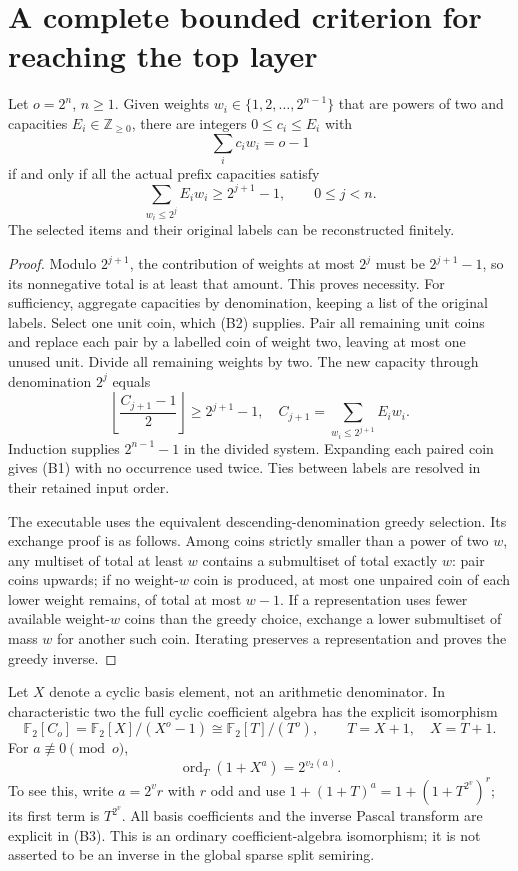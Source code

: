 \section{A complete bounded criterion for reaching the top layer}
\begin{lemma}\label{lem:coins}
Let $o=2^n$, $n\ge1$. Given weights $w_i\in\{1,2,\ldots,2^{n-1}\}$
that are powers of two and capacities $E_i\in\mathbb Z_{\ge0}$, there are
integers $0\le c_i\le E_i$ with
\[
 \sum_i c_iw_i=o-1                                        \tag{B1}
\]
if and only if all the actual prefix capacities satisfy
\[
 \boxed{\sum_{w_i\le2^j}E_iw_i\ge2^{j+1}-1,
 \qquad0\le j<n.}                                        \tag{B2}
\]
The selected items and their original labels can be reconstructed finitely.
\end{lemma}
\begin{proof}
Modulo $2^{j+1}$, the contribution of weights at most $2^j$ must be
$2^{j+1}-1$, so its nonnegative total is at least that amount. This proves
necessity. For sufficiency, aggregate capacities by denomination, keeping a
list of the original labels. Select one unit coin, which (B2) supplies.
Pair all remaining unit coins and replace each pair by a labelled coin of
weight two, leaving at most one unused unit. Divide all remaining weights
by two. The new capacity through denomination $2^j$ equals
\[
 \left\lfloor\frac{C_{j+1}-1}{2}\right\rfloor
 \ge2^{j+1}-1,
 \quad C_{j+1}=\sum_{w_i\le2^{j+1}}E_iw_i.
\]
Induction supplies $2^{n-1}-1$ in the divided system. Expanding each paired
coin gives (B1) with no occurrence used twice. Ties between labels are
resolved in their retained input order.

The executable uses the equivalent descending-denomination greedy selection.
Its exchange proof is as follows. Among coins strictly smaller than a
power of two $w$, any multiset of total at least $w$ contains a submultiset
of total exactly $w$: pair coins upwards; if no weight-$w$ coin is produced,
at most one unpaired coin of each lower weight remains, of total at most
$w-1$. If a representation uses fewer available weight-$w$ coins than the
greedy choice, exchange a lower submultiset of mass $w$ for another such coin.
Iterating preserves a representation and proves the greedy inverse.
\end{proof}

Let $X$ denote a cyclic basis element, not an arithmetic denominator. In
characteristic two the full cyclic coefficient algebra has the explicit
isomorphism
\[
 \mathbb F_2[C_o]=\mathbb F_2[X]/(X^o-1)
 \cong\mathbb F_2[T]/(T^o),\qquad T=X+1,\quad X=T+1.        \tag{B3}
\]
For $a\not\equiv0\pmod o$,
\[
 \operatorname{ord}_T(1+X^a)=2^{v_2(a)}.                   \tag{B4}
\]
To see this, write $a=2^vr$ with $r$ odd and use
$1+(1+T)^a=1+(1+T^{2^v})^r$; its first term is $T^{2^v}$.
All basis coefficients and the inverse Pascal transform are explicit in (B3).
This is an ordinary coefficient-algebra isomorphism; it is not asserted to
be an inverse in the global sparse split semiring.

